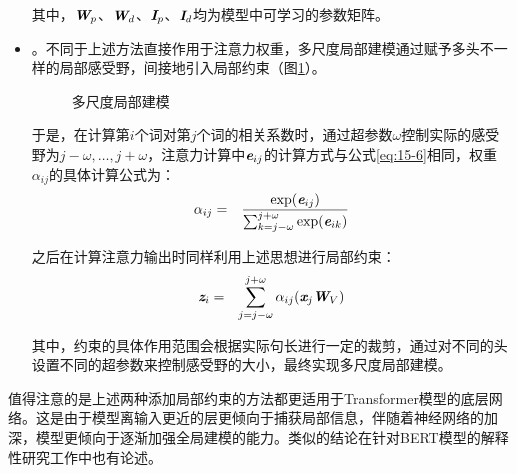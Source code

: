 \begin{itemize}
\noindent 其中，$\textbf{\em W}_p$、$\textbf{\em W}_d$、$\textbf{\em I}_p$、$\textbf{\em I}_d$均为模型中可学习的参数矩阵。

\vspace{0.5em}
\item {\small{}}。不同于上述方法直接作用于注意力权重，多尺度局部建模通过赋予多头不一样的局部感受野，间接地引入局部约束（图\ref{fig:15-4}）。

\begin{figure}[htp]
\centering

\caption{多尺度局部建模}
\label{fig:15-4}
\end{figure}

\noindent 于是，在计算第$i$个词对第$j$个词的相关系数时，通过超参数$\omega$控制实际的感受野为$j-\omega,\ldots,j+\omega$，注意力计算中$\textbf{\em e}_{ij}$的计算方式与公式\eqref{eq:15-6}相同，权重$\alpha_{ij}$的具体计算公式为：
\begin{eqnarray}
\alpha_{ij} &=& \frac{\exp (\textbf{\em e}_{ij})}{\sum_{k=j-\omega}^{j+\omega}\exp (\textbf{\em e}_{ik})}
\label{eq:15-20}
\end{eqnarray}

\noindent 之后在计算注意力输出时同样利用上述思想进行局部约束：
\begin{eqnarray}
\textbf{\em z}_{i} &=& \sum_{j=j-\omega}^{j+\omega} \alpha_{ij}(\textbf{\em x}_j \textbf{\em W}_V)
\label{eq:15-22}
\end{eqnarray}

\noindent 其中，约束的具体作用范围会根据实际句长进行一定的裁剪，通过对不同的头设置不同的超参数来控制感受野的大小，最终实现多尺度局部建模。

\vspace{0.5em}
\end{itemize}

\parinterval 值得注意的是上述两种添加局部约束的方法都更适用于Transformer模型的底层网络。这是由于模型离输入更近的层更倾向于捕获局部信息，伴随着神经网络的加深，模型更倾向于逐渐加强全局建模的能力。类似的结论在针对BERT模型的解释性研究工作中也有论述。


